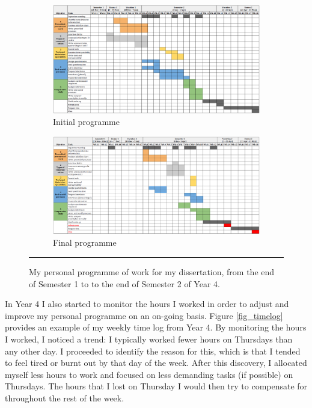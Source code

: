 \begin{figure}[htbp]
    \centering
        \begin{subfigure}{.48\textwidth}
          \centering
          \includegraphics[width=\textwidth]{figures/DST-schedule-start.PNG}
          \caption{Initial programme}
          \label{DST_schedule01}
        \end{subfigure}
        \begin{subfigure}{.485\textwidth}
          \centering
          \includegraphics[width=\textwidth]{figures/DST-schedule-end-big.PNG}
          \caption{Final programme}
          \label{DST_schedule02}
        \end{subfigure}
    \rule{\textwidth}{0.5pt} %
    \caption[My personal programme of work for my dissertation.]{My personal programme of work for my dissertation, from the end of Semester 1 to to the end of Semester 2 of Year 4.}
    \label{DST_schedule}
\end{figure}


In Year 4 I also started to monitor the hours I worked in order to adjust and improve my personal programme on an on-going basis.
Figure \ref{fig_timelog} provides an example of my weekly time log from Year 4.
By monitoring the hours I worked, I noticed a trend: I typically worked fewer hours on Thursdays than any other day.
I proceeded to identify the reason for this, which is that I tended to feel tired or burnt out by that day of the week.
After this discovery, I allocated myself less hours to work and focused on less demanding tasks (if possible) on Thursdays.
The hours that I lost on Thursday I would then try to compensate for throughout the rest of the week.


